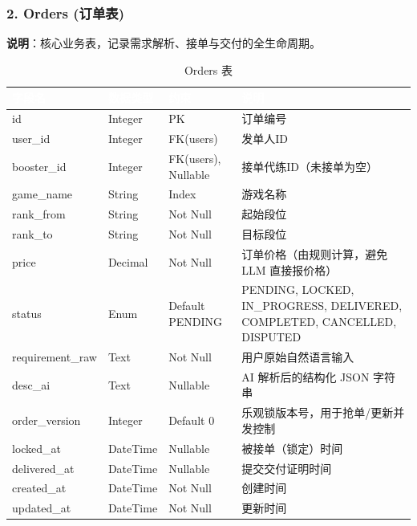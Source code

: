 \documentclass[12pt,a4paper]{article}
\begin{document}
\subsubsection{2. Orders (订单表)}
\textbf{说明}：核心业务表，记录需求解析、接单与交付的全生命周期。
\begin{table}[H]
\centering
\renewcommand{\arraystretch}{1.25}
\begin{tabularx}{\textwidth}{|l|l|l|X|}
\hline
\rowcolor{headerblue} \textcolor{white}{\textbf{字段名}} & \textcolor{white}{\textbf{数据类型}} & \textcolor{white}{\textbf{约束}} & \textcolor{white}{\textbf{说明}} \\
\hline
id & Integer & PK & 订单编号 \\
\hline
user\_id & Integer & FK(users) & 发单人ID \\
\hline
booster\_id & Integer & FK(users), Nullable & 接单代练ID（未接单为空） \\
\hline
game\_name & String & Index & 游戏名称 \\
\hline
rank\_from & String & Not Null & 起始段位 \\
\hline
rank\_to & String & Not Null & 目标段位 \\
\hline
price & Decimal & Not Null & 订单价格（由规则计算，避免 LLM 直接报价格） \\
\hline
status & Enum & Default PENDING & PENDING, LOCKED, IN\_PROGRESS, DELIVERED, COMPLETED, CANCELLED, DISPUTED \\
\hline
requirement\_raw & Text & Not Null & 用户原始自然语言输入 \\
\hline
desc\_ai & Text & Nullable & AI 解析后的结构化 JSON 字符串 \\
\hline
order\_version & Integer & Default 0 & 乐观锁版本号，用于抢单/更新并发控制 \\
\hline
locked\_at & DateTime & Nullable & 被接单（锁定）时间 \\
\hline
delivered\_at & DateTime & Nullable & 提交交付证明时间 \\
\hline
created\_at & DateTime & Not Null & 创建时间 \\
\hline
updated\_at & DateTime & Not Null & 更新时间 \\
\hline
\end{tabularx}
\caption{Orders 表}
\end{table}


\end{document}
